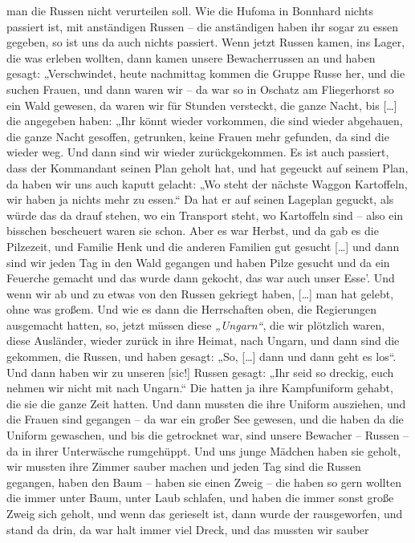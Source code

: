 \documentclass[ngerman,]{article}
\begin{document}
\begin{multicols}{3}
\begin{description}
man die Russen nicht verurteilen soll. Wie die Hufoma in Bonnhard nichts
passiert ist, mit anständigen Russen – die anständigen haben ihr sogar
zu essen gegeben, so ist uns da auch nichts passiert. Wenn jetzt Russen
kamen, ins Lager, die was erleben wollten, dann kamen unsere
Bewacherrussen an und haben gesagt: „Verschwindet, heute nachmittag
kommen die Gruppe Russe her, und die suchen Frauen, und dann waren wir –
da war so in Oschatz am Fliegerhorst so ein Wald gewesen, da waren wir
für Stunden versteckt, die ganze Nacht, bis {[}\ldots{}{]} die angegeben
haben: „Ihr könnt wieder vorkommen, die sind wieder abgehauen, die ganze
Nacht gesoffen, getrunken, keine Frauen mehr gefunden, da sind die
wieder weg. Und dann sind wir wieder zurückgekommen. Es ist auch
passiert, dass der Kommandant seinen Plan geholt hat, und hat gegeuckt
auf seinem Plan, da haben wir uns auch kaputt gelacht: „Wo steht der
nächste Waggon Kartoffeln, wir haben ja nichts mehr zu essen.“ Da hat er
auf seinen Lageplan geguckt, als würde das da drauf stehen, wo ein
Transport steht, wo Kartoffeln sind – also ein bisschen bescheuert waren
sie schon. Aber es war Herbst, und da gab es die Pilzezeit, und Familie
Henk und die anderen Familien gut gesucht {[}\ldots{}{]} und dann sind
wir jeden Tag in den Wald gegangen und haben Pilze gesucht und da ein
Feuerche gemacht und das wurde dann gekocht, das war auch unser Esse'.
Und wenn wir ab und zu etwas von den Russen gekriegt haben,
{[}\ldots{}{]} man hat gelebt, ohne was großem. Und wie es dann die
Herrschaften oben, die Regierungen ausgemacht hatten, so, jetzt müssen
diese \emph{„Ungarn“}, die wir plötzlich waren, diese Ausländer, wieder
zurück in ihre Heimat, nach Ungarn, und dann sind die gekommen, die
Russen, und haben gesagt: „So, {[}\ldots{}{]} dann und dann geht es
los“. Und dann haben wir zu unseren {[}sic!{]} Russen gesagt: „Ihr seid
so dreckig, euch nehmen wir nicht mit nach Ungarn.“ Die hatten ja ihre
Kampfuniform gehabt, die sie die ganze Zeit hatten. Und dann mussten die
ihre Uniform ausziehen, und die Frauen sind gegangen – da war ein großer
See gewesen, und die haben da die Uniform gewaschen, und bis die
getrocknet war, sind unsere Bewacher – Russen – da in ihrer Unterwäsche
rumgehüppt. Und uns junge Mädchen haben sie geholt, wir mussten ihre
Zimmer sauber machen und jeden Tag sind die Russen gegangen, haben den
Baum – haben sie einen Zweig – die haben so gern wollten die immer unter
Baum, unter Laub schlafen, und haben die immer sonst große Zweig sich
geholt, und wenn das gerieselt ist, dann wurde der rausgeworfen, und
stand da drin, da war halt immer viel Dreck, und das mussten wir sauber

\end{description}
\end{multicols}
\end{document}
